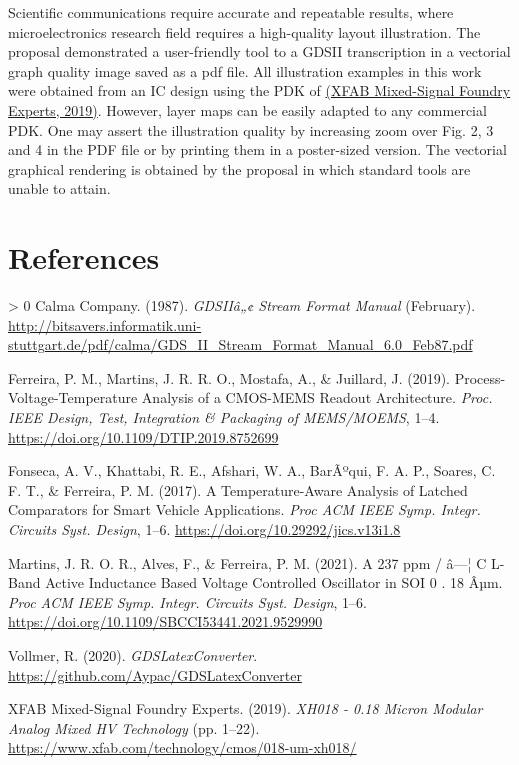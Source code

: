 \documentclass[10pt,a4paper,onecolumn]{article}
\let\textttOrig=\texttt
\def\texttt#1{\expandafter\textttOrig{\seqsplit{#1}}}
\newlength{\cslhangindent}
\newenvironment{CSLReferences}[3] %
 {%
  \setlength{\parindent}{0pt}
  \ifodd #1 \everypar{\setlength{\hangindent}{\cslhangindent}}\ignorespaces\fi
  \ifnum #2 > 0
  \setlength{\parskip}{#2\baselineskip}
  \fi
 }%
 {}
\let\addcontentslineOrig=\addcontentsline
\def\addcontentsline#1#2#3{\bgroup
  \let\texttt=\textttOrig\addcontentslineOrig{#1}{#2}{#3}\egroup}
\begin{document}
Scientific communications require accurate and repeatable results, where
microelectronics research field requires a high-quality layout
illustration. The proposal demonstrated a user-friendly tool to a GDSII
transcription in a vectorial graph quality image saved as a pdf file.
All illustration examples in this work were obtained from an IC design
using the PDK of \hyperlink{ref-XFAB2019}{(XFAB Mixed-Signal Foundry Experts, 2019)}. However,
layer maps can be easily adapted to any commercial PDK. One may assert
the illustration quality by increasing zoom over Fig. 2, 3 and 4 in the
PDF file or by printing them in a poster-sized version. The vectorial
graphical rendering is obtained by the proposal in which standard tools
are unable to attain.

\hypertarget{references}{%
\section*{References}\label{references}}

\hypertarget{refs}{}
\begin{CSLReferences}{1}{0}
\leavevmode\hypertarget{ref-Calma1987}{}%
Calma Company. (1987). \emph{{GDSIIâ„¢ Stream Format Manual}} (February).
\url{http://bitsavers.informatik.uni-stuttgart.de/pdf/calma/GDS_II_Stream_Format_Manual_6.0_Feb87.pdf}

\leavevmode\hypertarget{ref-Ferreira2019b}{}%
Ferreira, P. M., Martins, J. R. R. O., Mostafa, A., \& Juillard, J.
(2019). {Process-Voltage-Temperature Analysis of a CMOS-MEMS Readout
Architecture}. \emph{Proc. IEEE Design, Test, Integration \& Packaging
of MEMS/MOEMS}, 1--4. \url{https://doi.org/10.1109/DTIP.2019.8752699}

\leavevmode\hypertarget{ref-Fonseca2017}{}%
Fonseca, A. V., Khattabi, R. E., Afshari, W. A., BarÃºqui, F. A. P.,
Soares, C. F. T., \& Ferreira, P. M. (2017). {A Temperature-Aware
Analysis of Latched Comparators for Smart Vehicle Applications}.
\emph{Proc ACM IEEE Symp. Integr. Circuits Syst. Design}, 1--6.
\url{https://doi.org/10.29292/jics.v13i1.8}

\leavevmode\hypertarget{ref-Martins2021}{}%
Martins, J. R. O. R., Alves, F., \& Ferreira, P. M. (2021). {A 237 ppm /
â—¦ C L-Band Active Inductance Based Voltage Controlled Oscillator in SOI
0 . 18 Âµm}. \emph{Proc ACM IEEE Symp. Integr. Circuits Syst. Design},
1--6. \url{https://doi.org/10.1109/SBCCI53441.2021.9529990}

\leavevmode\hypertarget{ref-Vollmer2020}{}%
Vollmer, R. (2020). \emph{{GDSLatexConverter}}.
\url{https://github.com/Aypac/GDSLatexConverter}

\leavevmode\hypertarget{ref-XFAB2019}{}%
XFAB Mixed-Signal Foundry Experts. (2019). \emph{{XH018 - 0.18 Micron
Modular Analog Mixed HV Technology}} (pp. 1--22).
\url{https://www.xfab.com/technology/cmos/018-um-xh018/}

\end{CSLReferences}
\end{document}
